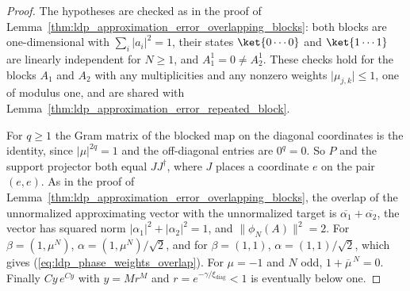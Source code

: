 \begin{proof}
    \leanok
    The hypotheses are checked as in the proof of
    Lemma~\ref{thm:ldp_approximation_error_overlapping_blocks}: both blocks are
    one-dimensional with $\sum_i\lvert a_i\rvert^2=1$, their states $\ket{0\cdots0}$
    and $\ket{1\cdots1}$ are linearly independent for $N\geq1$, and
    $A_1^1=0\neq A_2^1$. These checks hold for the blocks $A_1$ and $A_2$ with any
    multiplicities and any nonzero weights $\lvert\mu_{j,k}\rvert\leq1$, one of modulus
    one, and are shared with
    Lemma~\ref{thm:ldp_approximation_error_repeated_block}.

    For $q\geq1$ the Gram matrix of the blocked map on the diagonal coordinates is the
    identity, since $\lvert\mu\rvert^{2q}=1$ and the off-diagonal entries are
    $0^q=0$. So $P$ and the support projector both equal $JJ^\dagger$, where $J$ places
    a coordinate $e$ on the pair $(e,e)$. As in the proof of
    Lemma~\ref{thm:ldp_approximation_error_overlapping_blocks}, the overlap of the
    unnormalized approximating vector with the unnormalized target is
    $\overline{\alpha_1}+\overline{\alpha_2}$, the vector has squared norm
    $\lvert\alpha_1\rvert^2+\lvert\alpha_2\rvert^2=1$, and
    $\lVert\phi_N(A)\rVert^2=2$. For $\beta=(1,\mu^N)$,
    $\alpha=(1,\mu^N)/\sqrt2$, and for $\beta=(1,1)$, $\alpha=(1,1)/\sqrt2$, which gives
    (\ref{eq:ldp_phase_weights_overlap}). For $\mu=-1$ and $N$ odd,
    $1+\overline\mu^{\,N}=0$. Finally $Cy\,e^{Cy}$ with $y=Mr^M$ and
    $r=e^{-\gamma/\xi_{\mathrm{diag}}}<1$ is eventually below one.
\end{proof}

